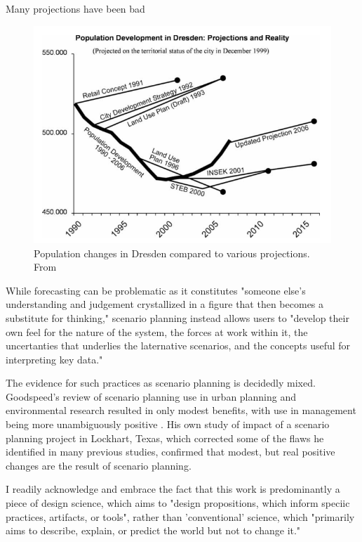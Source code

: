 Many projections have been bad

\begin{figure}[h]
	\centering
	\includegraphics[scale=0.35]{Figures/chap2/dresden_projections.png}
	\caption[Population changes in Dresden compared to various projections]{Population changes in Dresden compared to various projections. From \cite{wiechmannErrorsExpectedAligning2008}}
	\label{fig:dresden_population}
\end{figure}


While forecasting can be problematic as it constitutes "someone else's understanding and judgement crystallized in a figure that then becomes a substitute for thinking," scenario planning instead allows users to "develop their own feel for the nature of the system, the forces at work within it, the uncertanties that underlies the laternative scenarios, and the concepts useful for interpreting key data." \cite{wackScenariosShootingRapids1985}

The evidence for such practices as scenario planning is decidedly mixed. Goodspeed's review of scenario planning use in urban planning and environmental research resulted in only modest benefits, with use in management being more unambiguously positive \cite{goodspeedScenarioPlanningCities2020}. His own study of impact of a scenario planning project in Lockhart, Texas, which corrected some of the flaws he identified in many previous studies, confirmed that modest, but real positive changes are the result of scenario planning.

I readily acknowledge and embrace the fact that this work is predominantly a piece of design science, which aims to "design propositions, which inform speciic practices, artifacts, or tools", rather than 'conventional' science, which "primarily aims to describe, explain, or predict the world but not to change it." \cite{goodspeedScenarioPlanningCities2020}

